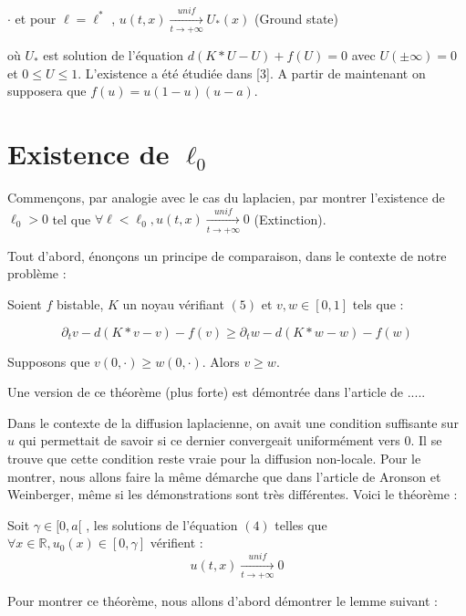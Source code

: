 \documentclass{article}
\begin{document}
$\cdot$ et pour $\ell = \ell^* $ , $u(t,x) \underset{t \to +\infty}{\overset{unif}{\longrightarrow}}U_{*}(x)$ (Ground state)

\noindent où $U_*$ est solution de l'équation $d(K*U-U) + f(U) = 0$ avec $U(\pm \infty) = 0$ et $ 0 \le U \le 1 $. L'existence a été étudiée dans [3]. A partir de maintenant on supposera que $f(u) = u(1-u)(u-a)$.

\section{Existence de $\ell_0$}

Commençons, par analogie avec le cas du laplacien, par montrer l'existence de $\ell_0>0$ tel que $\forall \ell < \ell_0 , u(t,x) \underset{t \to +\infty}{\overset{unif}{\longrightarrow}}0$ (Extinction). \newline

Tout d'abord, énonçons un principe de comparaison, dans le contexte de notre problème : \newline
\begin{Theoreme}
Soient $f$ bistable, $K$ un noyau vérifiant $(5)$ et $v,w \in [0,1]$ tels que :

\begin{equation*}
\partial_t v - d(K*v - v) - f(v) \geq \partial_t w - d(K*w - w) - f(w)
\end{equation*}

Supposons que  $v(0,\cdot) \ge w(0,\cdot)$. Alors $v \ge w$.
\end{Theoreme}

Une version de ce théorème (plus forte) est démontrée dans l'article de .....\newline

Dans le contexte de la diffusion laplacienne, on avait une condition suffisante sur $u$ qui permettait de savoir si ce dernier convergeait uniformément vers 0. Il se trouve que cette condition reste vraie pour la diffusion non-locale. Pour le montrer, nous allons faire la même démarche que dans l'article de Aronson et Weinberger, même si les démonstrations sont très différentes. Voici le théorème : \newline

\begin{Theoreme}
Soit $\gamma \in [0,a[$ , les solutions de l'équation $(4)$ telles que $\forall x \in \mathbb{R}, u_0(x) \in [0,\gamma] $ vérifient :
\begin{equation*}
u(t,x) \underset{t \to +\infty}{\overset{unif}{\longrightarrow}}0
\end{equation*}
\end{Theoreme}
Pour montrer ce théorème, nous allons d'abord démontrer le lemme suivant : \newline 
\end{document}
